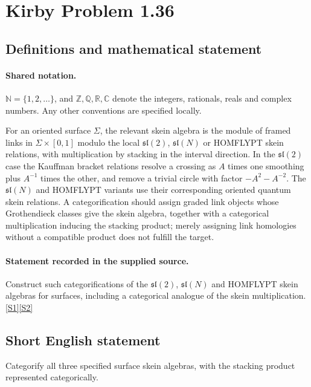 \documentclass[11pt]{article}
\newcommand{\sref}[2]{\hyperlink{source:#1:#2}{[S#2]}}
\begin{document}
\section{Kirby Problem 1.36}\label{statement}

\subsection{Definitions and mathematical statement}

\paragraph{Shared notation.}$\mathbb N=\{1,2,\ldots\}$, and $\mathbb Z,\mathbb Q,\mathbb R,\mathbb C$ denote the integers, rationals, reals and complex numbers. Any other conventions are specified locally.


For an oriented surface $\Sigma$, the relevant skein algebra is the module of framed links in $\Sigma\times[0,1]$ modulo the local $\mathfrak{sl}(2)$, $\mathfrak{sl}(N)$ or HOMFLYPT skein relations, with multiplication by stacking in the interval direction. In the $\mathfrak{sl}(2)$ case the Kauffman bracket relations resolve a crossing as $A$ times one smoothing plus $A^{-1}$ times the other, and remove a trivial circle with factor $-A^2-A^{-2}$. The $\mathfrak{sl}(N)$ and HOMFLYPT variants use their corresponding oriented quantum skein relations. A categorification should assign graded link objects whose Grothendieck classes give the skein algebra, together with a categorical multiplication inducing the stacking product; merely assigning link homologies without a compatible product does not fulfill the target.
\paragraph{Statement recorded in the supplied source.}
Construct such categorifications of the $\mathfrak{sl}(2)$, $\mathfrak{sl}(N)$ and HOMFLYPT skein algebras for surfaces, including a categorical analogue of the skein multiplication. \sref{statement}{1}\sref{statement}{2}
\subsection{Short English statement}
Categorify all three specified surface skein algebras, with the stacking product represented categorically.
\end{document}
